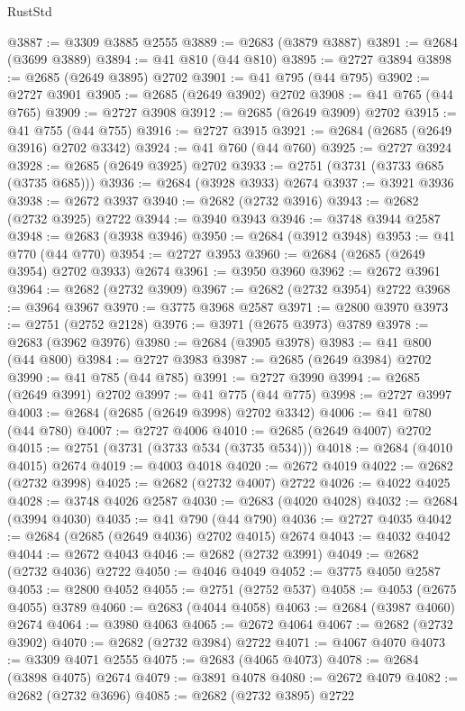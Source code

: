 \begin{lexlean}{RustStd}
\begin{coremodule}
@3887 := @3309 @3885 @2555
@3889 := @2683 (@3879 @3887)
@3891 := @2684 (@3699 @3889)
@3894 := @41 @810 (@44 @810)
@3895 := @2727 @3894
@3898 := @2685 (@2649 @3895) @2702
@3901 := @41 @795 (@44 @795)
@3902 := @2727 @3901
@3905 := @2685 (@2649 @3902) @2702
@3908 := @41 @765 (@44 @765)
@3909 := @2727 @3908
@3912 := @2685 (@2649 @3909) @2702
@3915 := @41 @755 (@44 @755)
@3916 := @2727 @3915
@3921 := @2684 (@2685 (@2649 @3916) @2702 @3342)
@3924 := @41 @760 (@44 @760)
@3925 := @2727 @3924
@3928 := @2685 (@2649 @3925) @2702
@3933 := @2751 (@3731 (@3733 @685 (@3735 @685)))
@3936 := @2684 (@3928 @3933) @2674
@3937 := @3921 @3936
@3938 := @2672 @3937
@3940 := @2682 (@2732 @3916)
@3943 := @2682 (@2732 @3925) @2722
@3944 := @3940 @3943
@3946 := @3748 @3944 @2587
@3948 := @2683 (@3938 @3946)
@3950 := @2684 (@3912 @3948)
@3953 := @41 @770 (@44 @770)
@3954 := @2727 @3953
@3960 := @2684 (@2685 (@2649 @3954) @2702 @3933) @2674
@3961 := @3950 @3960
@3962 := @2672 @3961
@3964 := @2682 (@2732 @3909)
@3967 := @2682 (@2732 @3954) @2722
@3968 := @3964 @3967
@3970 := @3775 @3968 @2587
@3971 := @2800 @3970
@3973 := @2751 (@2752 @2128)
@3976 := @3971 (@2675 @3973) @3789
@3978 := @2683 (@3962 @3976)
@3980 := @2684 (@3905 @3978)
@3983 := @41 @800 (@44 @800)
@3984 := @2727 @3983
@3987 := @2685 (@2649 @3984) @2702
@3990 := @41 @785 (@44 @785)
@3991 := @2727 @3990
@3994 := @2685 (@2649 @3991) @2702
@3997 := @41 @775 (@44 @775)
@3998 := @2727 @3997
@4003 := @2684 (@2685 (@2649 @3998) @2702 @3342)
@4006 := @41 @780 (@44 @780)
@4007 := @2727 @4006
@4010 := @2685 (@2649 @4007) @2702
@4015 := @2751 (@3731 (@3733 @534 (@3735 @534)))
@4018 := @2684 (@4010 @4015) @2674
@4019 := @4003 @4018
@4020 := @2672 @4019
@4022 := @2682 (@2732 @3998)
@4025 := @2682 (@2732 @4007) @2722
@4026 := @4022 @4025
@4028 := @3748 @4026 @2587
@4030 := @2683 (@4020 @4028)
@4032 := @2684 (@3994 @4030)
@4035 := @41 @790 (@44 @790)
@4036 := @2727 @4035
@4042 := @2684 (@2685 (@2649 @4036) @2702 @4015) @2674
@4043 := @4032 @4042
@4044 := @2672 @4043
@4046 := @2682 (@2732 @3991)
@4049 := @2682 (@2732 @4036) @2722
@4050 := @4046 @4049
@4052 := @3775 @4050 @2587
@4053 := @2800 @4052
@4055 := @2751 (@2752 @537)
@4058 := @4053 (@2675 @4055) @3789
@4060 := @2683 (@4044 @4058)
@4063 := @2684 (@3987 @4060) @2674
@4064 := @3980 @4063
@4065 := @2672 @4064
@4067 := @2682 (@2732 @3902)
@4070 := @2682 (@2732 @3984) @2722
@4071 := @4067 @4070
@4073 := @3309 @4071 @2555
@4075 := @2683 (@4065 @4073)
@4078 := @2684 (@3898 @4075) @2674
@4079 := @3891 @4078
@4080 := @2672 @4079
@4082 := @2682 (@2732 @3696)
@4085 := @2682 (@2732 @3895) @2722

\end{coremodule}
\end{lexlean}
